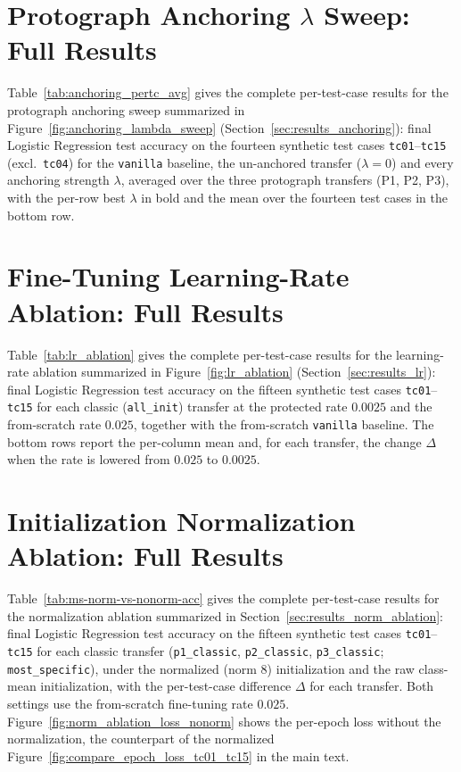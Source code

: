 \documentclass[a4paper,oneside,bibliography=totoc]{scrbook}
\begin{document}


\section{Protograph Anchoring $\lambda$ Sweep: Full Results}
\label{app:anchoring-lambda}

Table~\ref{tab:anchoring_pertc_avg} gives the complete per-test-case results for
the protograph anchoring sweep summarized in
Figure~\ref{fig:anchoring_lambda_sweep} (Section~\ref{sec:results_anchoring}):
final Logistic Regression test accuracy on the fourteen synthetic test cases
\texttt{tc01}--\texttt{tc15} (excl.\ \texttt{tc04}) for the \texttt{vanilla}
baseline, the un-anchored transfer (\(\lambda=0\)) and every anchoring strength
\(\lambda\), averaged over the three protograph transfers (P1, P2, P3), with the
per-row best \(\lambda\) in bold and the mean over the fourteen test cases in the
bottom row.



\section{Fine-Tuning Learning-Rate Ablation: Full Results}
\label{app:lr-ablation}

Table~\ref{tab:lr_ablation} gives the complete per-test-case results for the
learning-rate ablation summarized in Figure~\ref{fig:lr_ablation}
(Section~\ref{sec:results_lr}): final Logistic Regression test accuracy on the
fifteen synthetic test cases \texttt{tc01}--\texttt{tc15} for each classic
(\texttt{all\_init}) transfer at the protected rate $0.0025$ and the
from-scratch rate $0.025$, together with the from-scratch \texttt{vanilla}
baseline. The bottom rows report the per-column mean and, for each transfer, the
change $\Delta$ when the rate is lowered from $0.025$ to $0.0025$.



\section{Initialization Normalization Ablation: Full Results}
\label{app:norm-ablation}

Table~\ref{tab:ms-norm-vs-nonorm-acc} gives the complete per-test-case results
for the normalization ablation summarized in
Section~\ref{sec:results_norm_ablation}: final Logistic Regression test accuracy
on the fifteen synthetic test cases \texttt{tc01}--\texttt{tc15} for each classic
transfer (\texttt{p1\_classic}, \texttt{p2\_classic}, \texttt{p3\_classic};
\texttt{most\_specific}), under the normalized (norm $8$) initialization and the
raw class-mean initialization, with the per-test-case difference $\Delta$ for each
transfer. Both settings use the from-scratch fine-tuning rate $0.025$. Figure~\ref{fig:norm_ablation_loss_nonorm} shows the per-epoch loss
without the normalization, the counterpart of the normalized
Figure~\ref{fig:compare_epoch_loss_tc01_tc15} in the main text.
\end{document}
